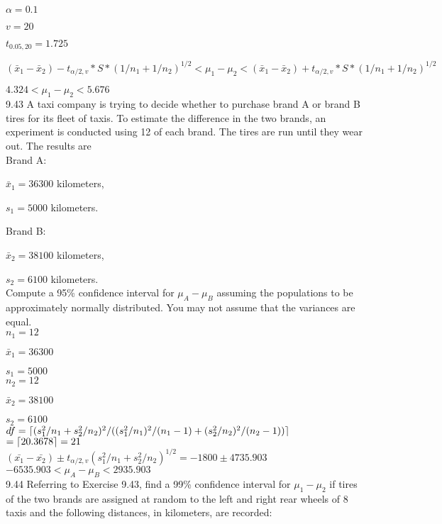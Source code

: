 $\alpha = 0.1$

$v = 20$

$t_{0.05,20} = 1.725$

$ (\bar{x}_1 - \bar{x}_2) - t_{\alpha/2, v} * S * (1/n_1 + 1/n_2)^{1/2} < \mu_1 - \mu_2 < (\bar{x}_1 - \bar{x}_2) + t_{\alpha/2, v} * S * (1/n_1 + 1/n_2)^{1/2}$

$4.324 < \mu_1 - \mu_2 < 5.676$ \\

9.43 A taxi company is trying to decide whether to purchase brand A or brand B tires for its fleet of taxis. To estimate the difference in the two brands, an experiment is conducted using 12 of each brand. The tires are run until they wear out. The results are \\

Brand A:

$\bar{x}_1 = 36300$ kilometers,

$s_1 = 5000$ kilometers.

Brand B:

$\bar{x}_2 = 38100$ kilometers,

$s_2 = 6100$ kilometers. \\

Compute a 95\% confidence interval for $\mu_A - \mu_B$ assuming the populations to be approximately normally distributed. You may not assume that the variances are equal. \\

$n_1 = 12$

$\bar{x}_1 = 36300$

$s_1 = 5000$ \\

$n_2 = 12$

$\bar{x}_2 = 38100$

$s_2 = 6100$ \\

$df = \lceil(s^2_1/n_1 + s^2_2/n_2)^2/((s^2_1/n_1)^2/(n_1-1) + (s_2^2/n_2)^2/(n_2 - 1))\rceil$$ = \lceil20.3678\rceil = 21$ \\


$(\bar{x_1} - \bar{x_2}) \pm t_{\alpha/2,v} (s_1^2/n_1 + s_2^2/n_2)^{1/2}$$= -1800 \pm 4735.903$ \\

$-6535.903 < \mu_A - \mu_B < 2935.903$ \\

9.44 Referring to Exercise 9.43, find a 99\% confidence interval for $\mu_1 - \mu_2$ if tires of the two brands are assigned at random to the left and right rear wheels of 8 taxis and the following distances, in kilometers, are recorded: \\

